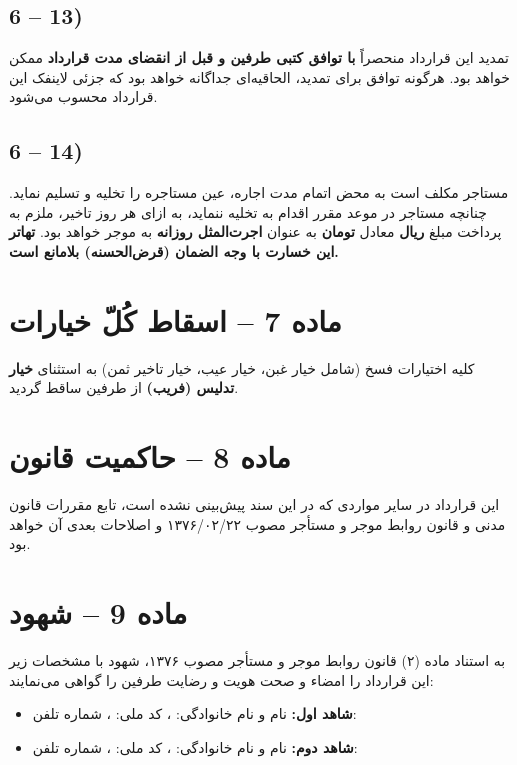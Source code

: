 \documentclass[14pt]{article}
\begin{document}
	\subsection*{6 – 13)}
	تمدید این قرارداد منحصراً
	\textbf{با توافق کتبی طرفین و قبل از انقضای مدت قرارداد} ممکن خواهد بود. هرگونه توافق برای تمدید، الحاقیه‌ای جداگانه خواهد بود که جزئی لاینفک این قرارداد محسوب می‌شود.
	\subsection*{6 – 14)}
	مستاجر مکلف است به محض اتمام مدت اجاره، عین مستاجره را تخلیه و تسلیم نماید. چنانچه مستاجر در موعد مقرر اقدام به تخلیه ننماید، به ازای هر روز تاخیر، ملزم به پرداخت مبلغ
	\underline{\hspace{3cm}}
	\textbf{ریال} معادل
	\underline{\hspace{3cm}}
	\textbf{تومان} به عنوان
	\textbf{اجرت‌المثل روزانه} به موجر خواهد بود.
	\textbf{تهاتر این خسارت با وجه الضمان (قرض‌الحسنه) بلامانع است.}
	
	\section*{ماده 7 – اسقاط کُلّ خیارات}
	کلیه اختیارات فسخ (شامل خیار غبن، خیار عيب، خیار تاخیر ثمن) به استثنای
	\textbf{خیار تدلیس (فریب)} از طرفین ساقط گردید.
	
	\section*{ماده 8 – حاکمیت قانون}
	این قرارداد در سایر مواردی که در این سند پیش‌بینی نشده است، تابع مقررات قانون مدنی و قانون روابط موجر و مستأجر مصوب ۱۳۷۶/۰۲/۲۲ و اصلاحات بعدی آن خواهد بود.
	
	\section*{ماده 9 – شهود}
	به استناد ماده (۲) قانون روابط موجر و مستأجر مصوب ۱۳۷۶، شهود با مشخصات زیر این قرارداد را امضاء و صحت هویت و رضایت طرفین را گواهی می‌نمایند:
	\begin{itemize}
		\item
		\textbf{شاهد اول:} نام و نام خانوادگی:
		\underline{\hspace{4cm}}، کد ملی:
		\underline{\hspace{3cm}}، شماره تلفن:
		\underline{\hspace{3cm}}
		\item
		\textbf{شاهد دوم:} نام و نام خانوادگی:
		\underline{\hspace{4cm}}، کد ملی:
		\underline{\hspace{3cm}}، شماره تلفن:
		\underline{\hspace{3cm}}
	\end{itemize}
	
\end{document}

